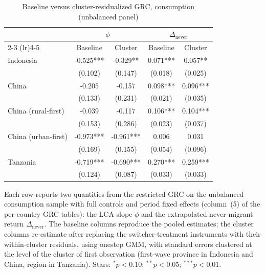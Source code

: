 \begin{table}[htb!] \centering \begin{threeparttable}
\caption{Baseline versus cluster-residualized GRC, consumption (unbalanced panel)}
\label{tab:verdier-robust}
\begin{tabular}{l cc cc} \toprule
                       & \multicolumn{2}{c}{$\phi$}
                       & \multicolumn{2}{c}{$\Delta_{\text{never}}$} \\
\cmidrule(lr){2-3} \cmidrule(lr){4-5}
                       & Baseline & Cluster & Baseline & Cluster \\
\midrule
Indonesia & -0.525*** & -0.329** & 0.071*** & 0.057** \\
 & (0.102) & (0.147) & (0.018) & (0.025) \\
\addlinespace
China & -0.205 & -0.157 & 0.098*** & 0.096*** \\
 & (0.133) & (0.231) & (0.021) & (0.035) \\
\addlinespace
China (rural-first) & -0.039 & -0.117 & 0.106*** & 0.104*** \\
 & (0.153) & (0.286) & (0.023) & (0.037) \\
\addlinespace
China (urban-first) & -0.973*** & -0.961*** & 0.006 & 0.031 \\
 & (0.169) & (0.155) & (0.054) & (0.096) \\
\addlinespace
Tanzania & -0.719*** & -0.690*** & 0.270*** & 0.259*** \\
 & (0.124) & (0.087) & (0.033) & (0.033) \\
\bottomrule
\end{tabular}
\begin{tablenotes}[flushleft] \footnotesize
\item{Each row reports two quantities from the restricted GRC on the unbalanced consumption sample with full controls and period fixed effects (column~(5) of the per-country GRC tables): the LCA slope $\phi$ and the extrapolated never-migrant return $\Delta_{\text{never}}$. The baseline columns reproduce the pooled estimates; the cluster columns re-estimate after replacing the switcher-treatment instruments with their within-cluster residuals, using onestep GMM, with standard errors clustered at the level of the cluster of first observation (first-wave province in Indonesia and China, region in Tanzania). Stars: $^{*}p<0.10$; $^{**}p<0.05$; $^{***}p<0.01$.}
\end{tablenotes} \end{threeparttable} \end{table}
